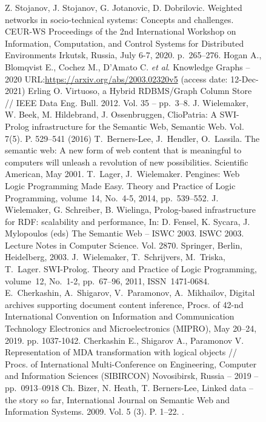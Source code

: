 \documentclass[ 

]{aiitart}
\begin{document}
\begin{figure}
\begin{thebibliography}{99}
 Z. Stojanov, J. Stojanov, G. Jotanovic, D. Dobrilovic. Weighted networks in socio-technical systems: Concepts and challenges. CEUR-WS Proceedings of the 2nd International Workshop on Information, Computation, and Control Systems for Distributed Environments Irkutsk, Russia, July 6-7, 2020. p.~265--276.
 Hogan A., Blomqvist E., Cochez M., D’Amato C. \emph{et al}. Knowledge Graphs -- 2020 URL:\url{https://arxiv.org/abs/2003.02320v5} (access date: 12-Dec-2021)
 Erling O. Virtuoso, a Hybrid RDBMS/Graph Column Store // IEEE Data Eng. Bull. 2012. Vol. 35 -- pp.~3--8.
  J. Wielemaker, W. Beek, M. Hildebrand, J. Ossenbruggen, ClioPatria: A
  SWI-Prolog infrastructure for the Semantic Web, Semantic Web.
  Vol. 7(5). P. 529--541 (2016) 
 T.~Berners-Lee, J.~Hendler, O.~Lassila.  The semantic web: A new form of web content that is meaningful to computers will unleash a revolution of new possibilities.  Scientific American, May 2001.
 T.~Lager, J.~Wielemaker. Pengines: Web Logic Programming Made Easy.  Theory and Practice of Logic Programming, volume~14, No.~4-5, 2014, pp.~539--552. 
  J. Wielemaker, G. Schreiber, B. Wielinga, Prolog-based infrastructure
  for RDF: scalability and performance, In: D. Fensel, K. Sycara,
  J. Mylopoulos (eds) The Semantic Web -- ISWC 2003. ISWC 2003. Lecture
  Notes in Computer Science. Vol. 2870. Springer, Berlin,
  Heidelberg, 2003.
 J.~Wielemaker, T.~Schrijvers, M.~Triska, T.~Lager. SWI-Prolog. Theory and Practice of Logic Programming, volume~12, No.~1-2, pp.~67--96, 2011, ISSN~1471-0684.
 E.~Cherkashin, A.~Shigarov, V.~Paramonov, A.~Mikhailov, Digital archives supporting document content inference, Procs.  of 42-nd International Convention on Information and Communication Technology Electronics and Microelectronics (MIPRO), May 20–24, 2019.  pp. 1037-1042. 
 Cherkashin E., Shigarov A., Paramonov V. Representation of MDA transformation with logical objects // Procs. of International Multi-Conference on Engineering, Computer and Information Sciences (SIBIRCON) Novosibirsk, Russia -- 2019 -- pp.~0913--0918 
 Ch. Bizer, N. Heath, T. Berners-Lee, Linked data -- the story so
  far, International Journal on Semantic Web and Information Systems.
  2009. Vol. 5 (3). P. 1--22. .

\end{thebibliography}
\end{figure}
\end{document}
